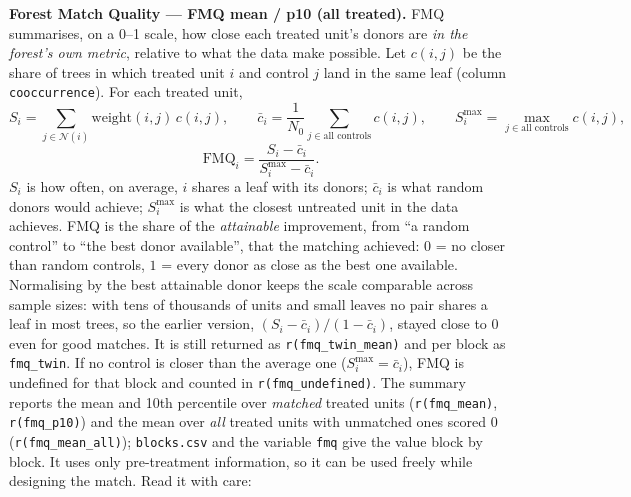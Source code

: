 \documentclass[11pt,a4paper]{article}
\newcommand{\code}[1]{\texttt{#1}}
\begin{document}
\medskip
\noindent\textbf{Forest Match Quality --- FMQ mean / p10 (all treated).}\label{sec:fmq}
FMQ summarises, on a 0--1 scale, how close each treated unit's donors are \emph{in the
forest's own metric}, relative to what the data make possible. Let $c(i,j)$ be the share of trees in which treated unit $i$ and control $j$
land in the same leaf (column \code{cooccurrence}). For each treated unit,
\[
S_i=\sum_{j\in\mathcal N(i)} \text{weight}(i,j)\,c(i,j),\qquad
\bar c_i=\frac{1}{N_0}\sum_{j\in\text{all controls}} c(i,j),\qquad
S^{\max}_i=\max_{j\in\text{all controls}} c(i,j),
\]
\[
\text{FMQ}_i=\frac{S_i-\bar c_i}{S^{\max}_i-\bar c_i}.
\]
$S_i$ is how often, on average, $i$ shares a leaf with its donors; $\bar c_i$ is what random
donors would achieve; $S^{\max}_i$ is what the closest untreated unit in the data achieves. FMQ is
the share of the \emph{attainable} improvement, from ``a random control'' to ``the best donor
available'', that the matching achieved: $0$ = no closer than random controls, $1$ = every donor as
close as the best one available. Normalising by the best attainable donor keeps the scale
comparable across sample sizes: with tens of thousands of units and small leaves no pair shares a
leaf in most trees, so the earlier version, $(S_i-\bar c_i)/(1-\bar c_i)$, stayed close to 0 even
for good matches. It is still returned as \code{r(fmq\_twin\_mean)} and per block as
\code{fmq\_twin}. If no control is closer than the average one ($S^{\max}_i=\bar c_i$), FMQ is
undefined for that block and counted in \code{r(fmq\_undefined)}. The summary reports the mean
and 10th percentile over \emph{matched} treated units (\code{r(fmq\_mean)}, \code{r(fmq\_p10)})
and the mean over \emph{all} treated units with unmatched ones scored 0 (\code{r(fmq\_mean\_all)});
\code{blocks.csv} and the variable \code{fmq} give the value block by block. It uses only
pre-treatment information, so it can be used freely while designing the match. Read it with care:
\end{document}

